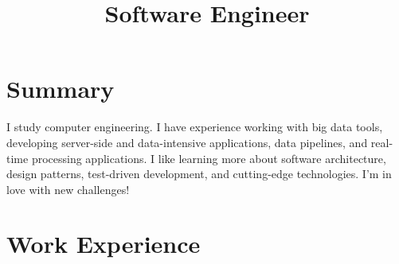 \documentclass[11pt, a4paper, color, final]{moderncv}
\title{Software Engineer}
\begin{document}
\maketitle

\section{Summary}
I study computer engineering. I have experience working with big data tools, developing server-side and data-intensive applications, data pipelines, and real-time processing applications.
I like learning more about software architecture, design patterns, test-driven development, and cutting-edge technologies.
I'm in love with new challenges!

\section{Work Experience}
\end{document}
